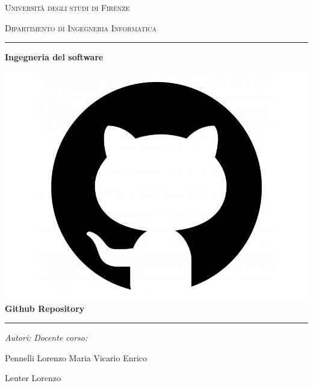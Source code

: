 \documentclass[10pt]{article}
\begin{document}
\begin{center}
\par\medskip
\textsc{{\large Università degli studi di Firenze}}\\
\par\medskip
\textsc{{\normalsize Dipartimento di Ingegneria Informatica}}\\
\par\medskip
\par\medskip
\hrule width 12cm height 1pt \par
\par\medskip
\par\medskip
\par\medskip
{\Large \textbf{Ingegneria del software}}\\
\par\medskip
\textbf{\href{https://github.com/Pennelli02/SweProject}{\includegraphics[scale=0.05]{unifilogo/logogit}}}\\
\textbf{Github Repository}\\
\par\medskip
\par\medskip
\par\medskip
\hrule width 12cm height 1pt \par
\par\medskip
\par\medskip
\par\medskip
\emph{Autori:} \hfill \emph{Docente corso:}\\
\par\medskip
Pennelli Lorenzo Maria \hfill Vicario Enrico\\
\begin{FlushLeft}
Leuter Lorenzo\\
\end{FlushLeft}

\end{center}
\end{document}
